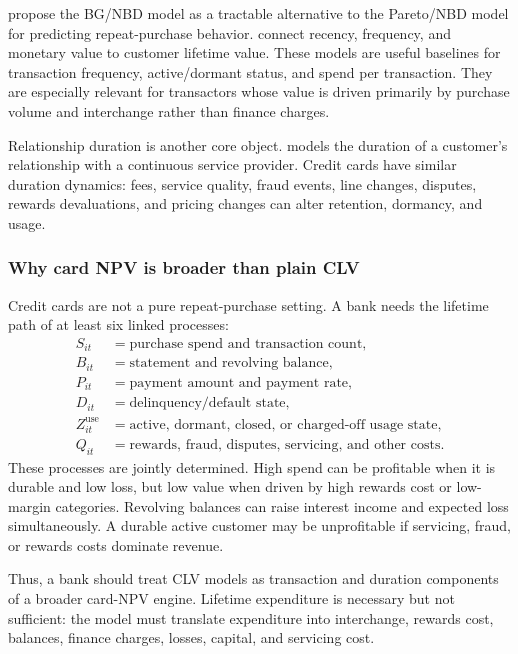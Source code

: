 \documentclass[11pt]{article}
\newcommand{\1}{\mathbf{1}}
\begin{document}
\citet{fader2005bgnbd} propose the BG/NBD model as a tractable alternative to
the Pareto/NBD model for predicting repeat-purchase behavior.
\citet{fader2005rfm} connect recency, frequency, and monetary value to customer
lifetime value. These models are useful baselines for transaction frequency,
active/dormant status, and spend per transaction. They are especially relevant
for transactors whose value is driven primarily by purchase volume and
interchange rather than finance charges.

Relationship duration is another core object. \citet{bolton1998duration} models
the duration of a customer's relationship with a continuous service provider.
Credit cards have similar duration dynamics: fees, service quality, fraud
events, line changes, disputes, rewards devaluations, and pricing changes can
alter retention, dormancy, and usage.

\subsubsection{Why card NPV is broader than plain CLV}

Credit cards are not a pure repeat-purchase setting. A bank needs the lifetime
path of at least six linked processes:
\begin{align}
  S_{it} &= \text{purchase spend and transaction count}, \\
  B_{it} &= \text{statement and revolving balance}, \\
  P_{it} &= \text{payment amount and payment rate}, \\
  D_{it} &= \text{delinquency/default state}, \\
  Z^{\mathrm{use}}_{it} &= \text{active, dormant, closed, or charged-off usage state}, \\
  Q_{it} &= \text{rewards, fraud, disputes, servicing, and other costs}.
\end{align}
These processes are jointly determined. High spend can be profitable when it is
durable and low loss, but low value when driven by high rewards cost or
low-margin categories. Revolving balances can raise interest income and
expected loss simultaneously. A durable active customer may be unprofitable if
servicing, fraud, or rewards costs dominate revenue.

Thus, a bank should treat CLV models as transaction and duration components of
a broader card-NPV engine. Lifetime expenditure is necessary but not sufficient:
the model must translate expenditure into interchange, rewards cost, balances,
finance charges, losses, capital, and servicing cost.
\end{document}
